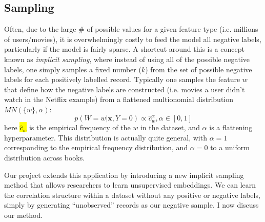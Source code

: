 \documentclass{article} %
\begin{document}
\subsection{Sampling}



Often, due to the large \# of possible values for a given feature type (i.e. millions of users/movies), it is overwhelmingly costly to feed the model all negative labels, particularly if the model is fairly sparse. A shortcut around this is a concept known as \textit{implicit sampling}, where instead of using all of the possible negative labels, one simply samples a fixed number ($k$) from the set of possible negative labels for each positively labelled record. Typically one samples the feature $w$ that define how the negative labels are constructed (i.e. movies a user didn't watch in the Netflix example) from a flattened multionomial distribution $MN(\{w\},\alpha)$: 
\[p(W=w|\mathbf{x},Y=0)  \propto \hat c_w^\alpha,\alpha \in [0,1] \] 
here \hl{$\hat c_w$}  is the empirical frequency of the $w$ in the dataset, and $\alpha$ is a flattening hyperparameter. This distribution is actually quite general, with $\alpha=1$ corresponding to the empirical frequency distribution, and $\alpha=0$ to a uniform distribution across books.


Our project extends this application by introducing a new implicit sampling method that allows researchers to learn unsupervised embeddings. We can learn the correlation structure within a dataset without any positive or negative labels, simply by generating ``unobserved'' records as our negative sample. I now discuss our method.
\end{document}
